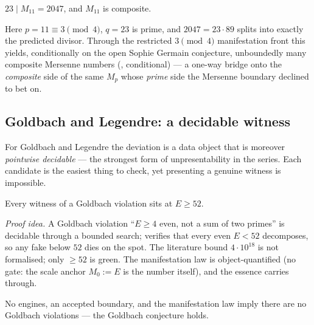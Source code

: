 \begin{theorem}\label{thm:mersenne_composite_examples}
\green{}\; $23\mid M_{11}=2047$, and $M_{11}$ is composite.
\end{theorem}

Here $p=11\equiv3\pmod4$, $q=23$ is prime, and $2047=23\cdot89$ splits into exactly the predicted
divisor. Through the restricted $3\pmod4$ manifestation front this yields, conditionally on the
open Sophie Germain conjecture, unboundedly many composite Mersenne numbers (\green{},
conditional) --- a one-way bridge onto the \emph{composite} side of the same $M_p$ whose
\emph{prime} side the Mersenne boundary declined to bet on.

\subsection{Goldbach and Legendre: a decidable witness}

For Goldbach and Legendre the deviation is a data object that is moreover \emph{pointwise
decidable} --- the strongest form of unpresentability in the series. Each candidate is the
easiest thing to check, yet presenting a genuine witness is impossible.

\begin{theorem}\label{thm:goldbachViolation_ge_52}
\green{}\; Every witness of a Goldbach violation sits at $E\ge 52$.
\end{theorem}

\emph{Proof idea.} A Goldbach violation ``$E\ge4$ even, not a sum of two primes'' is decidable
through a bounded search;  verifies that every even $E<52$ decomposes, so any fake
below $52$ dies on the spot. The literature bound $4\cdot10^{18}$ is not formalised; only
$\ge52$ is green. The manifestation law is object-quantified (no gate: the scale anchor
$M_0:=E$ is the number itself), and the essence carries through.

\begin{theorem}\label{thm:noGoldbachViolation_of_manifestation_and_boundary}
\green{}\; No engines, an accepted boundary, and the manifestation law imply there are no
Goldbach violations --- the Goldbach conjecture holds.
\end{theorem}

